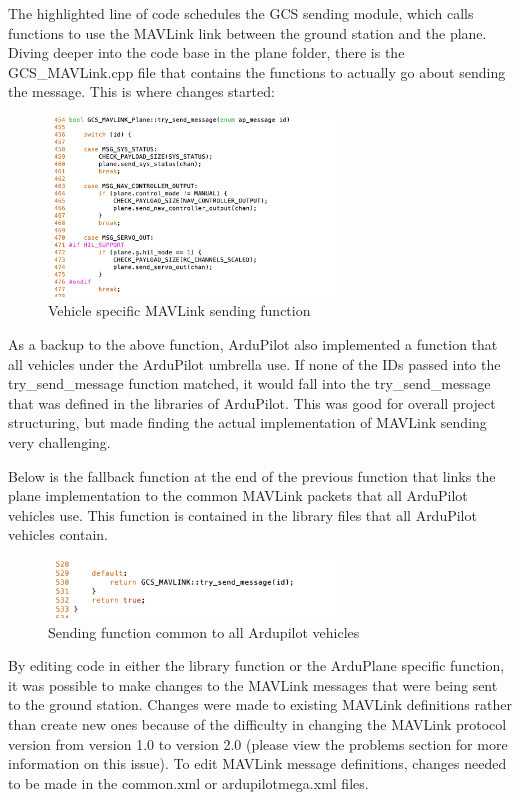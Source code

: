 \documentclass[12pt,journal,compsoc]{IEEEtran}
\begin{document}
The highlighted line of code schedules the GCS sending module, which calls functions to use the MAVLink link between the ground station and the plane. Diving deeper into the code base in the plane folder, there is the GCS\_MAVLink.cpp file that contains the functions to actually go about sending the message. This is where changes started:
\begin{figure}[h!]
\hspace*{0cm}
\centering
\includegraphics[width=3in]{GCS_Mavlink.png}
\caption{Vehicle specific MAVLink sending function}
\label{gcsMav}
\end{figure}

As a backup to the above function, ArduPilot also implemented a function that all vehicles under the ArduPilot umbrella use. If none of the IDs passed into the try\_send\_message function matched, it would fall into the try\_send\_message that was defined in the libraries of ArduPilot.  This was good for overall project structuring, but made finding the actual implementation of MAVLink sending very challenging. 

Below is the fallback function at the end of the previous function that links the plane implementation to the common MAVLink packets that all ArduPilot vehicles use. This function is contained in the library files that all ArduPilot vehicles contain. 
\begin{figure}[h!]
\hspace*{0cm}
\centering
\includegraphics[width=3in]{Fallthrough.png}
\caption{Sending function common to all Ardupilot vehicles}
\label{fallthrough}
\end{figure}

By editing code in either the library function or the ArduPlane specific function, it was possible to make changes to the MAVLink messages that were being sent to the ground station. 
Changes were made to existing MAVLink definitions rather than create new ones because of the difficulty in changing the MAVLink protocol version from version 1.0 to version 2.0 (please view the problems section for more information on this issue). To edit MAVLink message definitions, changes needed to be made in the common.xml or ardupilotmega.xml files.
\end{document}
